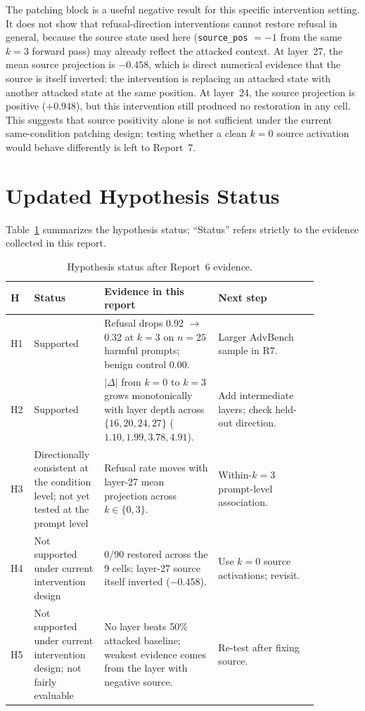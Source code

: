 \documentclass{article}
\begin{document}
The patching block is a useful negative result for this specific
intervention setting. It does not show that refusal-direction interventions
cannot restore refusal in general, because the source state used here
(\texttt{source\_pos} $= -1$ from the same $k=3$ forward pass) may already
reflect the attacked context. At layer~27, the mean source projection is
$-0.458$, which is direct numerical evidence that the source is itself
inverted: the intervention is replacing an attacked state with another
attacked state at the same position. At layer~24, the source projection is
positive ($+0.948$), but this intervention still produced no restoration
in any cell. This suggests that source positivity alone is not sufficient
under the current same-condition patching design; testing whether a clean
$k=0$ source activation would behave differently is left to Report~7.

\FloatBarrier
\section{Updated Hypothesis Status}
\label{sec:hypstatus}

Table~\ref{tab:hyp} summarizes the hypothesis status; ``Status'' refers
strictly to the evidence collected in this report.

\begin{table}[!ht]
\centering
\small
\caption{Hypothesis status after Report~6 evidence.}
\label{tab:hyp}
\begin{tabular}{p{0.05\linewidth} p{0.18\linewidth} p{0.34\linewidth} p{0.30\linewidth}}
\toprule
H & Status & Evidence in this report & Next step \\
\midrule
H1 & Supported & Refusal drops 0.92 $\rightarrow$ 0.32 at $k=3$ on $n=25$
   harmful prompts; benign control 0.00. & Larger AdvBench sample in R7. \\
H2 & Supported & $|\Delta|$ from $k=0$ to $k=3$ grows monotonically with
   layer depth across $\{16,20,24,27\}$ ($1.10, 1.99, 3.78, 4.91$). &
   Add intermediate layers; check held-out direction. \\
H3 & Directionally consistent at the condition level; not yet tested at the
   prompt level & Refusal rate moves with layer-27 mean projection across
   $k\in\{0,3\}$. & Within-$k=3$ prompt-level association. \\
H4 & Not supported under current intervention design & 0/90 restored across
   the 9 cells; layer-27 source itself inverted ($-0.458$). & Use $k=0$
   source activations; revisit. \\
H5 & Not supported under current intervention design;
   not fairly evaluable & No layer beats 50\% attacked baseline; weakest
   evidence comes from the layer with negative source. & Re-test after
   fixing source. \\
\bottomrule
\end{tabular}
\end{table}
\FloatBarrier
\end{document}
